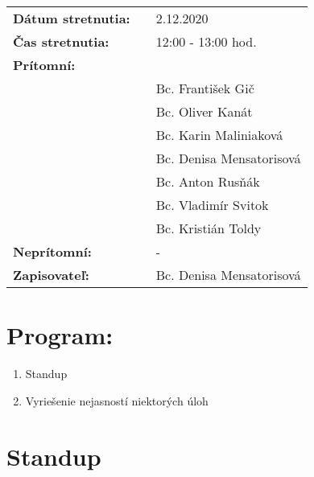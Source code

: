 \documentclass{article}
\begin{document}
    

    \begin{table}[h]
        \begin{tabular}{lllll}
            \multicolumn{3}{l}{\textbf{Dátum stretnutia:}} & & 2.12.2020 \\
            \multicolumn{3}{l}{\textbf{Čas stretnutia:}} & & 12:00 - 13:00 hod. \\
            \multicolumn{3}{l}{\textbf{Prítomní:}} \\
            & & & & Bc. František Gič  \\
            & & & & Bc. Oliver Kanát \\
            & & & & Bc. Karin Maliniaková \\
            & & & & Bc. Denisa Mensatorisová \\
            & & & & Bc. Anton Rusňák \\
            & & & & Bc. Vladimír Svitok \\
            & & & & Bc. Kristián Toldy \\
            \multicolumn{3}{l}{\textbf{Neprítomní:}} & & -\\
            \multicolumn{3}{l}{\textbf{Zapisovateľ:}} & & Bc. Denisa Mensatorisová \\
        \end{tabular}
        \label{tab:grades}
    \end{table}

    \section*{Program:}

    \begin{enumerate}
        \item Standup
        \item Vyriešenie nejasností niektorých úloh
    \end{enumerate}

    \section*{Standup}
\end{document}
